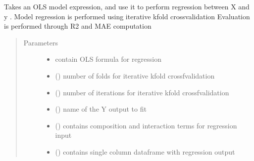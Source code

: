 \documentclass[letterpaper,10pt,english]{sphinxmanual}
\begin{document}

\begin{fulllineitems}
\label{\detokenize{MultipleRegression:MultipleRegression.fit_outputs}}
\sphinxAtStartPar
Takes an OLS model expression, and use it to perform regression between X and y .
Model regression is performed using iterative k\sphinxhyphen{}fold crossvalidation
Evaluation is performed through R2 and MAE computation
\begin{quote}\begin{description}
\item[{Parameters}] \leavevmode\begin{itemize}
\item {} 
\sphinxAtStartPar
{} \textendash{} contain OLS formula for regression

\item {} 
\sphinxAtStartPar
{} () \textendash{} number of folds for iterative k\sphinxhyphen{}fold crossfvalidation

\item {} 
\sphinxAtStartPar
{} () \textendash{} number of iterations for iterative k\sphinxhyphen{}fold crossfvalidation

\item {} 
\sphinxAtStartPar
{} () \textendash{} name of the Y output to fit

\item {} 
\sphinxAtStartPar
{} () \textendash{} contains composition and interaction terms for regression input

\item {} 
\sphinxAtStartPar
{} () \textendash{} contains single column dataframe with regression output


\end{itemize}
\end{description}
\end{quote}
\end{fulllineitems}
\end{document}

